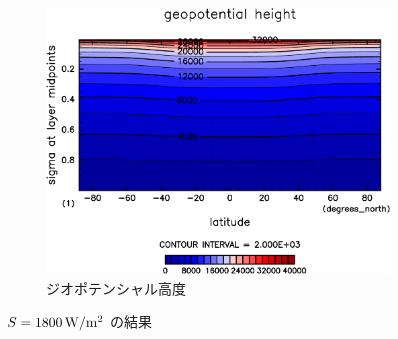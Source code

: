 \documentclass[body]{subfiles}
\begin{document}
\begin{figure}[t]
\begin{subfigure}{.4\textwidth}
		\includegraphics[width=\columnwidth]{S1800/Height,time=3650:4015-crop-rotate.pdf}
		\caption{ジオポテンシャル高度}
	\end{subfigure}
	\caption{
		\(S=1800\hmu{W/m^2}\) の結果
	}
\end{figure}
\end{document}
